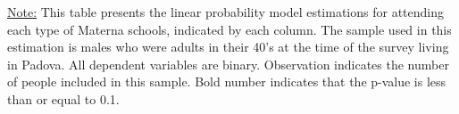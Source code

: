 \begin{footnotesize}
\noindent\underline{Note:} This table presents the linear probability model estimations for attending each type of Materna schools, indicated by each column. The sample used in this estimation is males who were adults in their 40's at the time of the survey living in Padova. All dependent variables are binary. Observation indicates the number of people included in this sample. Bold number indicates that the p-value is less than or equal to 0.1.
\end{footnotesize}
